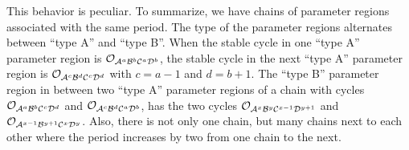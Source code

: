 This behavior is peculiar.
To summarize, we have chains of parameter regions associated with the same period.
The type of the parameter regions alternates between ``type A'' and ``type B''.
When the stable cycle in one ``type A'' parameter region is $\mathcal{O}_{\mathcal{A}^a\mathcal{B}^b\mathcal{C}^a\mathcal{D}^b}$, the stable cycle in the next ``type A'' parameter region is $\mathcal{O}_{\mathcal{A}^{c}\mathcal{B}^{d}\mathcal{C}^{c}\mathcal{D}^{d}}$ with $c = a - 1$ and $d = b + 1$.
The ``type B'' parameter region in between two ``type A'' parameter regions of a chain with cycles $\mathcal{O}_{\mathcal{A}^a\mathcal{B}^b\mathcal{C}^c\mathcal{D}^d}$ and $\mathcal{O}_{\mathcal{A}^{c}\mathcal{B}^{d}\mathcal{C}^{a}\mathcal{D}^{b}}$, has the two cycles $\mathcal{O}_{\mathcal{A}^x\mathcal{B}^y\mathcal{C}^{x-1}\mathcal{D}^{y+1}}$ and $\mathcal{O}_{\mathcal{A}^{x-1}\mathcal{B}^{y+1}\mathcal{C}^x\mathcal{D}^y}$.
Also, there is not only one chain, but many chains next to each other where the period increases by two from one chain to the next.
